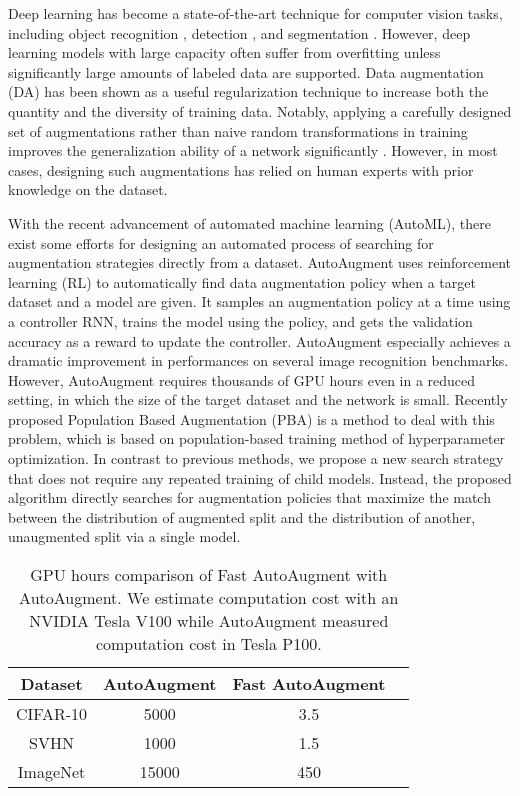 \documentclass{article}
\begin{document}
Deep learning has become a state-of-the-art technique for computer vision tasks, including object recognition \cite{yamada2018shakedrop, real2018regularized, hu2018squeeze}, detection \cite{ren2015faster, liu2016ssd}, and segmentation \cite{chen2018deeplab, he2017mask}. However, deep learning models with large capacity often suffer from overfitting unless significantly large amounts of labeled data are supported. Data augmentation (DA) has been shown as a useful regularization technique to increase both the quantity and the diversity of training data. Notably, applying a carefully designed set of augmentations rather than naive random transformations in training improves the generalization ability of a network significantly \cite{krizhevsky2012imagenet, paschali2019data}. However, in most cases, designing such augmentations has relied on human experts with prior knowledge on the dataset.
  
With the recent advancement of automated machine learning (AutoML), there exist some efforts for designing an automated process of searching for augmentation strategies directly from a dataset. AutoAugment \cite{cubuk2018autoaugment} uses reinforcement learning (RL) to automatically find data augmentation policy when a target dataset and a model are given. It samples an augmentation policy at a time using a controller RNN, trains the model using the policy, and gets the validation accuracy as a reward to update the controller. AutoAugment especially achieves a dramatic improvement in performances on several image recognition benchmarks. However, AutoAugment requires thousands of GPU hours even in a reduced setting, in which the size of the target dataset and the network is small. Recently proposed Population Based Augmentation (PBA) \cite{ho2019pba} is a method to deal with this problem, which is based on population-based training method of hyperparameter optimization. In contrast to previous methods, we propose a new search strategy that does not require any repeated training of child models. Instead, the proposed algorithm directly searches for augmentation policies that maximize the match between the distribution of augmented split and the distribution of another, unaugmented split via a single model.

\begin{table}[t!] \center
\label{table:GPU hours}
\begin{tabular}{c c c c }
\toprule
Dataset & AutoAugment \cite{cubuk2018autoaugment} & Fast AutoAugment
\tabularnewline
\midrule
CIFAR-10 & 5000 & 3.5 \\
SVHN & 1000 & 1.5 \\
ImageNet & 15000 & 450
\tabularnewline
\bottomrule
\end{tabular}
\caption{GPU hours comparison of Fast AutoAugment with AutoAugment. We estimate computation cost with an NVIDIA Tesla V100 while AutoAugment measured computation cost in Tesla P100.}
\end{table}
\end{document}
